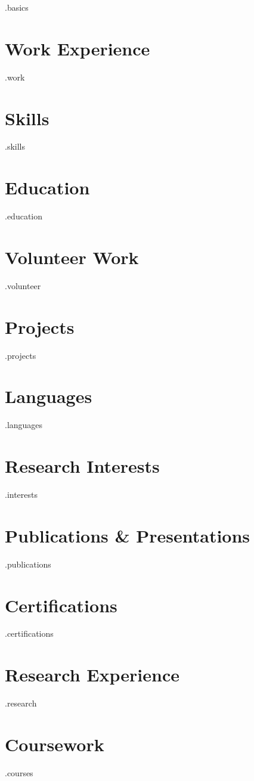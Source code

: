 \documentclass[a4paper,9pt]{extarticle}
\begin{document}
\begin{center}{.basics}\end{center}

\section*{Work Experience}
{.work}

\section*{Skills}
{.skills}

\section*{Education}
{.education}

\section*{Volunteer Work}
{.volunteer}

\section*{Projects}
{.projects}

\section*{Languages}
{.languages}

\section*{Research Interests}
{.interests}

\section*{Publications & Presentations}
{.publications}

\section*{Certifications}
{.certifications}

\section*{Research Experience}
{.research}

\section*{Coursework}
{.courses}
\end{document}
